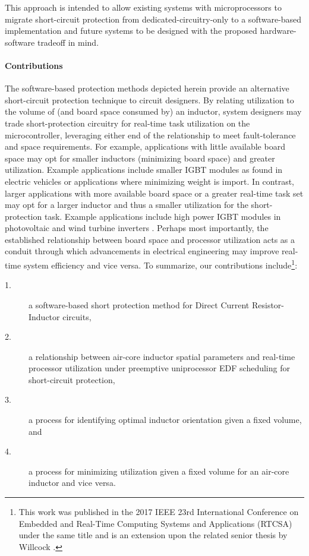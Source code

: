 This approach is intended to allow existing systems with microprocessors to migrate short-circuit protection from dedicated-circuitry-only to a software-based implementation and future systems to be designed with the proposed hardware-software tradeoff in mind.

\paragraph{Contributions}
The software-based protection methods depicted herein provide an alternative short-circuit protection technique to circuit designers.
By relating utilization to the volume of (and board space consumed by) an inductor, system designers may trade short-protection circuitry for real-time task utilization on the microcontroller, leveraging either end of the relationship to meet fault-tolerance and space requirements.
For example, applications with little available board space may opt for smaller inductors (minimizing board space) and greater utilization.
Example applications include smaller IGBT modules as found in electric vehicles or applications where minimizing weight is import\cite{ji_situ_2013}.
In contrast, larger applications with more available board space or a greater real-time task set may opt for a larger inductor and thus a smaller utilization for the short-protection task.
Example applications include high power IGBT modules in photovoltaic and wind turbine inverters \cite{zhang_model-based_2011}\cite{busca_overview_2011}.
Perhaps most importantly, the established relationship between board space and processor utilization acts as a conduit through which advancements in electrical engineering may improve real-time system efficiency and vice versa.
To summarize, our contributions include\footnote{This work was published in the 2017 IEEE 23rd International Conference on Embedded and Real-Time Computing Systems and Applications (RTCSA) under the same title \cite{willcock_trading_2017-1} and is an extension upon the related senior thesis by Willcock \cite{willcock_short_2016}.}:%
\begin{description}
\item [1.] a software-based short protection method for Direct Current Resistor-Inductor circuits,
\item [2.] a relationship between air-core inductor spatial parameters and real-time processor utilization under preemptive uniprocessor EDF scheduling for short-circuit protection,
\item [3.] a process for identifying optimal inductor orientation given a fixed volume, and
\item [4.] a process for minimizing utilization given a fixed volume for an air-core inductor and vice versa.
\end{description}


